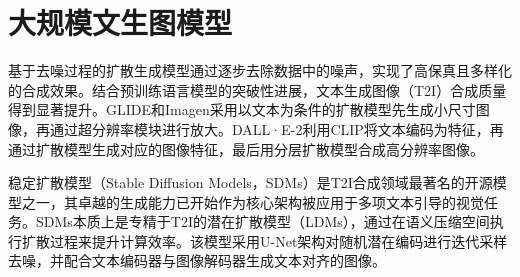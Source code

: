\documentclass[11pt,a4paper,UTF8]{ctexart}
\begin{document}
\section{大规模文生图模型}

基于去噪过程的扩散生成模型\cite{song2019generative,song2020improved,ho2020denoising}通过逐步去除数据中的噪声，实现了高保真且多样化的合成效果。结合预训练语言模型\cite{raffel2020exploring,radford2021learning}的突破性进展，文本生成图像（T2I）合成质量得到显著提升。GLIDE\cite{pmlr-v162-nichol22a}和Imagen\cite{saharia2022photorealistic}采用以文本为条件的扩散模型先生成小尺寸图像，再通过超分辨率模块进行放大。DALL·E-2\cite{ramesh2022hierarchical}利用CLIP将文本编码为特征，再通过扩散模型生成对应的图像特征，最后用分层扩散模型合成高分辨率图像。


稳定扩散模型（Stable Diffusion Models，SDMs）\cite{rombach2022high}是T2I合成领域最著名的开源模型之一，其卓越的生成能力已开始作为核心架构被应用于多项文本引导的视觉任务\cite{blattmann2023videoldm,brooks2023instructpix2pix,wang2023score,zhang2023adding}。SDMs本质上是专精于T2I的潜在扩散模型（LDMs）\cite{rombach2022high}，通过在语义压缩空间执行扩散过程\cite{ho2022classifier,liu2021pseudo,song2020denoising}来提升计算效率。该模型采用U-Net架构\cite{ronneberger2015u,dhariwal2021diffusion}对随机潜在编码进行迭代采样去噪，并配合文本编码器\cite{radford2021learning}与图像解码器\cite{esser2021taming,van2017neural}生成文本对齐的图像。
\end{document}

